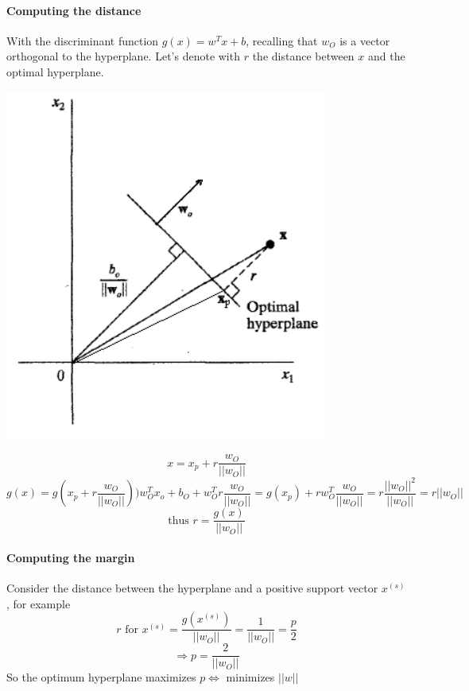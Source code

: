 \documentclass[10pt]{report}
\begin{document}
\paragraph{Computing the distance} With the discriminant function $g(x) = w^Tx + b$, recalling that $w_O$ is a vector orthogonal to the hyperplane. Let's denote with $r$ the distance between $x$ and the optimal hyperplane.
\begin{center}
	\includegraphics[scale=0.5]{20.png}
\end{center}
$$x=x_p+r\frac{w_O}{||w_O||}$$
$$g(x) = g\left(x_p + r\frac{w_O}{||w_O||}\right) ) w_O^Tx_o + b_O + w_O^Tr\frac{w_O}{||w_O||} = g(x_p) + rw_O^T\frac{w_O}{||w_O||} = r\frac{||w_O||^2}{||w_O||} = r||w_O||$$
$$\text{thus }r=\frac{g(x)}{||w_O||}$$
\paragraph{Computing the margin} Consider the distance between the hyperplane and a positive support vector $x^{(s)}$, for example $$r\text{ for }x^{(s)} = \frac{g(x^{(s)})}{||w_O||} = \frac{1}{||w_O||} = \frac{p}{2}$$
$$\Rightarrow p = \frac{2}{||w_O||}$$
So the optimum hyperplane maximizes $p\Leftrightarrow$ minimizes $||w||$
\end{document}
